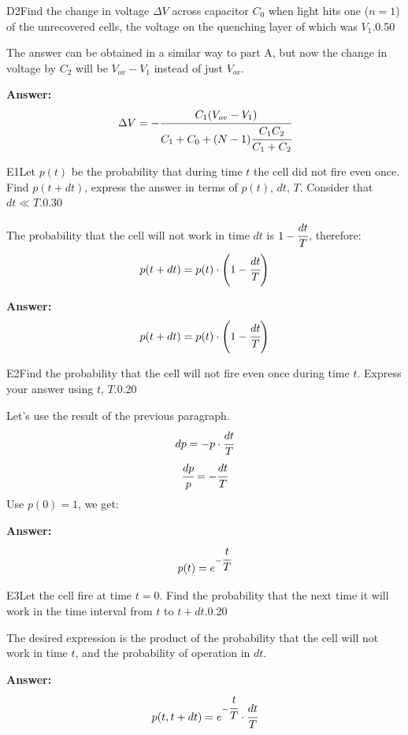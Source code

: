 \documentclass[11pt,a4paper]{article}
\begin{document}
\begin{solcard}{D2}{Find the change in voltage $\Delta{V}$ across capacitor $C_0$ when light hits one ($n=1$) of the unrecovered cells, the voltage on the quenching layer of which was $V_1$.}{0.50}

The answer can be obtained in a similar way to part A, but now the change in voltage by $C_2$ will be $V_{ov} - V_1$ instead of just $V_{ov}$.

\par\smallskip\noindent\textbf{Answer:} $$\Delta V = -\cfrac{ C_1( V_{ov} - V_1)}{C_1 + C_0 + (N-1)\cfrac{C_1 C_2}{C_1 + C_2}}$$
\end{solcard}

\begin{solcard}{E1}{Let $p(t)$ be the probability that during time $t$ the cell did not fire even once. Find $p(t + dt)$, express the answer in terms of $p(t)$, $dt$, $T$. Consider that $dt \ll T$.}{0.30}

The probability that the cell will not work in time $dt$ is $1 - \cfrac{dt}{T}$, therefore: $$p(t+dt) = p(t) \cdot\left(1 - \cfrac{dt}{T}\right)$$

\par\smallskip\noindent\textbf{Answer:} $$p(t+dt) = p(t) \cdot\left(1 - \cfrac{dt}{T}\right)$$
\end{solcard}

\begin{solcard}{E2}{Find the probability that the cell will not fire even once during time $t$. Express your answer using $t$, $T$.}{0.20}

Let's use the result of the previous paragraph. $$dp = -p\cdot\cfrac{dt}{T}$$$$\cfrac{dp}{p} = -\cfrac{dt}{T}$$Use $p(0) = 1$, we get:

\par\smallskip\noindent\textbf{Answer:} $$p(t) = e^{-\cfrac{t}{T}}$$
\end{solcard}

\begin{solcard}{E3}{Let the cell fire at time $t = 0$. Find the probability that the next time it will work in the time interval from $t$ to $t + dt$.}{0.20}

The desired expression is the product of the probability that the cell will not work in time $t$, and the probability of operation in $dt$.

\par\smallskip\noindent\textbf{Answer:} $$p(t, t+dt) = e^{-\cfrac{t}{T}} \cdot \cfrac{dt}{T}$$
\end{solcard}
\end{document}
